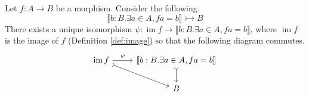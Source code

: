 \documentclass{tac}
\newcommand{\lto}{\longrightarrow}
\begin{document}
	\begin{lemma}\label{lem:image_interpretation}
		Let $f: A \lto B$ be a morphism. Consider the following.
		\begin{equation}
			\llbracket b:B. \exists a \in A, fa = b\rrbracket\rightarrowtail B
		\end{equation}
		There exists a unique isomorphism $\psi:  \operatorname{im}f \lto\llbracket b:B. \exists a \in A, fa = b \rrbracket$, where $\operatorname{im}f$ is the image of $f$ (Definition \ref{def:image}) so that the following diagram commutes.
		\begin{equation}
			\begin{tikzcd}
				\operatorname{im}f\arrow[dr,rightarrowtail]\arrow[r,"{\psi}"] & \llbracket b:B. \exists a \in A, fa = b\rrbracket\arrow[d,rightarrowtail]\\
				& B
			\end{tikzcd}
		\end{equation}
	\end{lemma}
\end{document}
